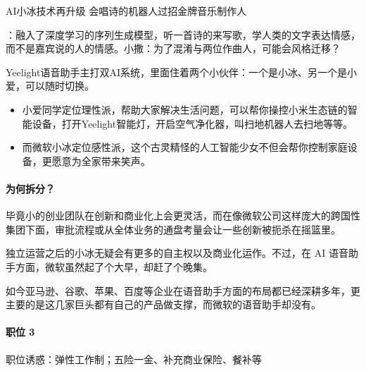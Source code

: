 \documentclass[letterpaper,10pt,english]{sphinxmanual}
\begin{document}
AI小冰技术再升级
会唱诗的机器人过招金牌音乐制作人%
\begin{footnote}[1055]\sphinxAtStartFootnote
{}
%
\end{footnote}：融入了深度学习的序列生成模型，听一首诗的来写歌，学人类的文字表达情感，而不是嘉宾说的人的情感。小撒：为了混淆与两位作曲人，可能会风格迁移？

Yeelight语音助手主打双AI系统，里面住着两个小伙伴：一个是小冰、另一个是小爱，可以随时切换。
\begin{itemize}
\item {} 
小爱同学定位理性派，帮助大家解决生活问题，可以帮你操控小米生态链的智能设备，打开Yeelight智能灯，开启空气净化器，叫扫地机器人去扫地等等。

\item {} 
而微软小冰定位感性派，这个古灵精怪的人工智能少女不但会帮你控制家庭设备，更愿意为全家带来笑声。%
\begin{footnote}[1056]\sphinxAtStartFootnote
{}
%
\end{footnote}

\end{itemize}


\paragraph{为何拆分？}
\label{\detokenize{chapter_AI_company/xiaoice:id5}}
毕竟小的创业团队在创新和商业化上会更灵活，而在像微软公司这样庞大的跨国性集团下面，审批流程或从全体业务的通盘考量会让一些创新被扼杀在摇篮里。%
\begin{footnote}[1057]\sphinxAtStartFootnote
{}
%
\end{footnote}

独立运营之后的小冰无疑会有更多的自主权以及商业化运作。不过，在 AI
语音助手方面，微软虽然起了个大早，却赶了个晚集。

如今亚马逊、谷歌、苹果、百度等企业在语音助手方面的布局都已经深耕多年，更主要的是这几家巨头都有自己的产品做支撑，而微软的语音助手却没有。


\paragraph{职位 3\sphinxfootnotemark[1058]}
\label{\detokenize{chapter_AI_company/xiaoice:id6}}%
\begin{footnotetext}[1058]\sphinxAtStartFootnote
{}
%
\end{footnotetext}\ignorespaces 
职位诱惑：弹性工作制；五险一金、补充商业保险、餐补等
\end{document}
